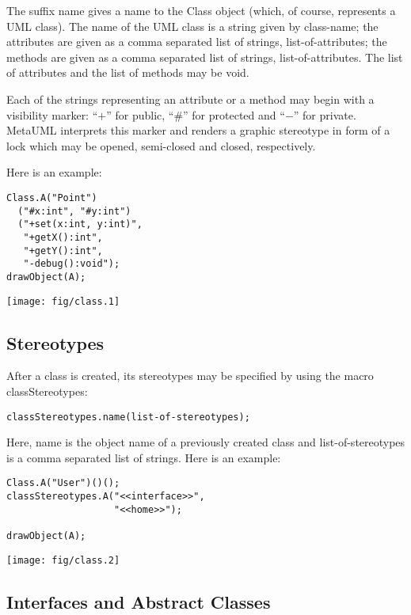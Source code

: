 \documentclass{article}
\newcommand{\code}{\ttfamily}
\begin{document}
The suffix {\code name} gives a name to the {\code Class} object (which, of course, represents a UML class).
The name of the UML class is a string given by {\code class-name};
the attributes are given as a comma separated list of strings, {\code list-of-attributes};
the methods are given as a comma separated list of strings, {\code list-of-attributes}.
The list of attributes and the list of methods may be void.

Each of the strings representing an attribute or a method may begin with a visibility marker: ``$+$'' for
public, ``\#'' for protected and ``$-$'' for private. MetaUML interprets this marker and renders a
graphic stereotype in form of a lock which may be opened, semi-closed and closed, respectively.

Here is an example:

\begin{multicols}{2}
\begin{verbatim}
Class.A("Point")
  ("#x:int", "#y:int")
  ("+set(x:int, y:int)",
   "+getX():int",
   "+getY():int",
   "-debug():void");
drawObject(A);
\end{verbatim}
\columnbreak
\texttt{[image: fig/class.1]}
\end{multicols}

\subsection{Stereotypes}

After a class is created, its stereotypes may be specified by using the macro {\code classStereotypes}:

\begin{verbatim}
classStereotypes.name(list-of-stereotypes);
\end{verbatim}

Here, {\code name} is the object name of a previously created class and {\code list-of-stereotypes}
is a comma separated list of strings. Here is an example:

\begin{multicols}{2}
\begin{verbatim}
Class.A("User")()();
classStereotypes.A("<<interface>>",
                   "<<home>>");

drawObject(A);
\end{verbatim}
\columnbreak
\hspace{1cm}\texttt{[image: fig/class.2]}
\end{multicols}

\subsection{Interfaces and Abstract Classes}
\end{document}
